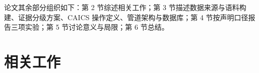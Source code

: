 \documentclass[11pt]{article}
\begin{document}
{\cjkfont 论\allowbreak 文\allowbreak 其\allowbreak 余\allowbreak 部\allowbreak 分\allowbreak 组\allowbreak 织\allowbreak 如\allowbreak 下\allowbreak ：\allowbreak 第} 2 {\cjkfont 节\allowbreak 综\allowbreak 述\allowbreak 相\allowbreak 关\allowbreak 工\allowbreak 作\allowbreak ；\allowbreak 第} 3 {\cjkfont 节\allowbreak 描\allowbreak 述\allowbreak 数\allowbreak 据\allowbreak 来\allowbreak 源\allowbreak 与\allowbreak 语\allowbreak 料\allowbreak 构\allowbreak 建\allowbreak 、\allowbreak 证\allowbreak 据\allowbreak 分\allowbreak 级\allowbreak 方\allowbreak 案\allowbreak 、}CAICS {\cjkfont 操\allowbreak 作\allowbreak 定\allowbreak 义\allowbreak 、\allowbreak 管\allowbreak 道\allowbreak 架\allowbreak 构\allowbreak 与\allowbreak 数\allowbreak 据\allowbreak 库\allowbreak ；\allowbreak 第} 4 {\cjkfont 节\allowbreak 按\allowbreak 声\allowbreak 明\allowbreak 口\allowbreak 径\allowbreak 报\allowbreak 告\allowbreak 三\allowbreak 项\allowbreak 实\allowbreak 验\allowbreak ；\allowbreak 第} 5 {\cjkfont 节\allowbreak 讨\allowbreak 论\allowbreak 意\allowbreak 义\allowbreak 与\allowbreak 局\allowbreak 限\allowbreak ；\allowbreak 第} 6 {\cjkfont 节\allowbreak 总\allowbreak 结\allowbreak 。}

\section{{\cjkfont 相\allowbreak 关\allowbreak 工\allowbreak 作}}
\end{document}
